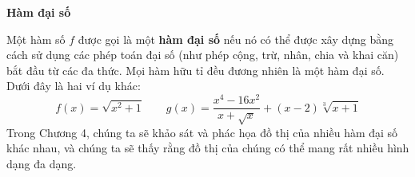 \begin{minipage}[t]{0.708\textwidth}
    \vspace{1em}
    \noindent{\color{stewartcyan}\rule{1.1ex}{1.1ex}}\hspace{0.5em}\textbf{\textsf{Hàm đại số}}
    \vspace{0.4em}

    \noindent Một hàm số $f$ được gọi là một \textbf{hàm đại số} nếu nó có thể được xây dựng bằng cách sử dụng các phép toán đại số (như phép cộng, trừ, nhân, chia và khai căn) bắt đầu từ các đa thức. Mọi hàm hữu tỉ đều đương nhiên là một hàm đại số. Dưới đây là hai ví dụ khác:
    \begin{equation*}
    f(x) = \sqrt{x^2 + 1} \qquad g(x) = \frac{x^4 - 16x^2}{x + \sqrt{x}} + (x - 2)\sqrt[3]{x + 1}
    \end{equation*}
    Trong Chương 4, chúng ta sẽ khảo sát và phác họa đồ thị của nhiều hàm đại số khác nhau, và chúng ta sẽ thấy rằng đồ thị của chúng có thể mang rất nhiều hình dạng đa dạng.
\end{minipage}